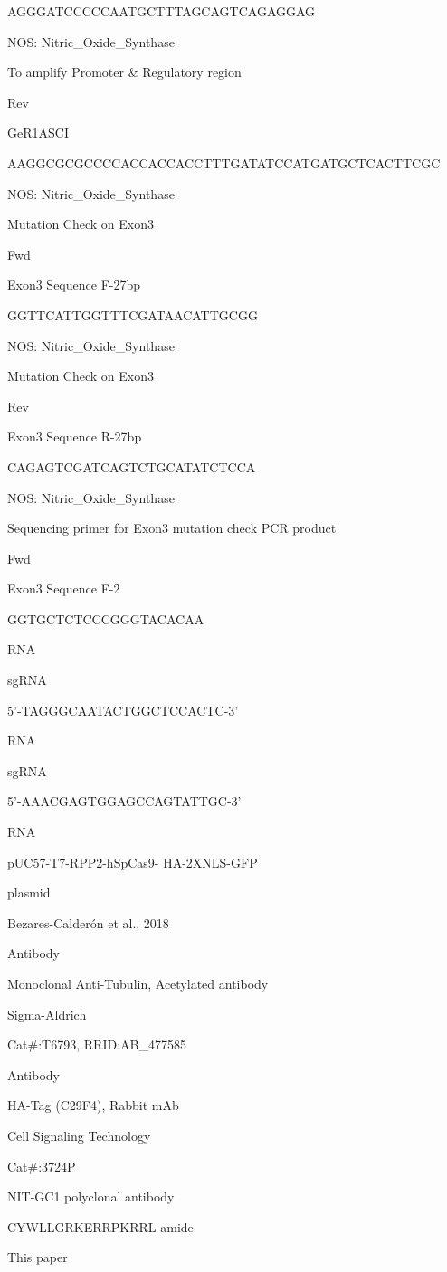 \documentclass[
  10pt,
  onecolumn]{article}
\begin{document}
AGGGATCCCCCAATGCTTTAGCAGTCAGAGGAG

NOS: Nitric\_Oxide\_Synthase

To amplify Promoter \& Regulatory region

Rev

GeR1ASCI

AAGGCGCGCCCCACCACCACCTTTGATATCCATGATGCTCACTTCGC

NOS: Nitric\_Oxide\_Synthase

Mutation Check on Exon3

Fwd

Exon3 Sequence F-27bp

GGTTCATTGGTTTCGATAACATTGCGG

NOS: Nitric\_Oxide\_Synthase

Mutation Check on Exon3

Rev

Exon3 Sequence R-27bp

CAGAGTCGATCAGTCTGCATATCTCCA

NOS: Nitric\_Oxide\_Synthase

Sequencing primer for Exon3 mutation check PCR product

Fwd

Exon3 Sequence F-2

GGTGCTCTCCCGGGTACACAA

RNA

sgRNA

5'-TAGGGCAATACTGGCTCCACTC-3'

RNA

sgRNA

5'-AAACGAGTGGAGCCAGTATTGC-3'

RNA

pUC57-T7-RPP2-hSpCas9- HA-2XNLS-GFP

plasmid

Bezares-Calderón et al., 2018

Antibody

Monoclonal Anti-Tubulin, Acetylated antibody

Sigma-Aldrich

Cat\#:T6793, RRID:AB\_477585

Antibody

HA-Tag (C29F4), Rabbit mAb

Cell Signaling Technology

Cat\#:3724P

NIT-GC1 polyclonal antibody

CYWLLGRKERRPKRRL-amide

This paper
\end{document}
